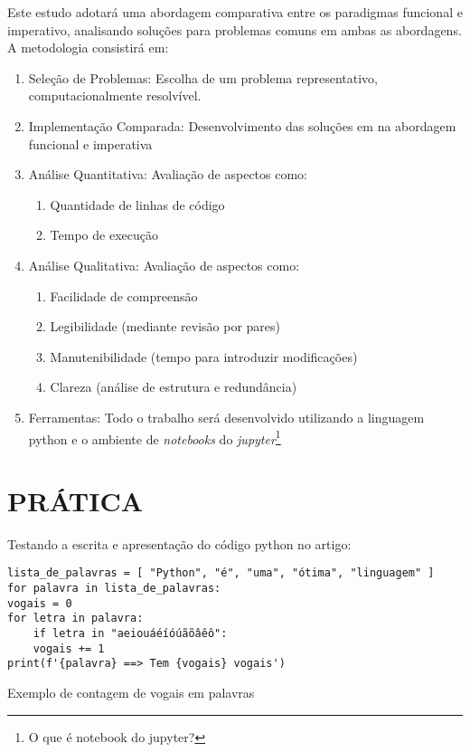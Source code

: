 \documentclass[date,twocolumn,a4paper]{ppgem}
\begin{document}
Este estudo adotará uma abordagem comparativa entre os paradigmas funcional e imperativo, analisando soluções para problemas comuns em ambas as abordagens. A metodologia consistirá em:
\begin{enumerate}
    \item Seleção de Problemas: Escolha de um problema representativo, computacionalmente resolvível.
    \item Implementação Comparada: Desenvolvimento das soluções em na abordagem funcional e imperativa
    \item Análise Quantitativa: Avaliação de aspectos como:
    \begin{enumerate}
        \item Quantidade de linhas de código
        \item Tempo de execução
    \end{enumerate}
    \item Análise Qualitativa: Avaliação de aspectos como:
    \begin{enumerate}
        \item Facilidade de compreensão
        \item Legibilidade (mediante revisão por pares)
        \item Manutenibilidade (tempo para introduzir modificações)
        \item Clareza (análise de estrutura e redundância)
    \end{enumerate}
    \item Ferramentas: Todo o trabalho será desenvolvido utilizando a linguagem python
        e o ambiente de \textit{notebooks} do \textit{jupyter}\footnote{O que é notebook do jupyter?}
\end{enumerate}




\section{PRÁTICA}

Testando a escrita e apresentação do código python no artigo:

\renewcommand{\listingscaption}{Código}

\begin{listing}[!ht]
\begin{verbatim}
lista_de_palavras = [ "Python", "é", "uma", "ótima", "linguagem" ]
for palavra in lista_de_palavras:
vogais = 0
for letra in palavra:
    if letra in "aeiouáéíóúãõâêô":
    vogais += 1
print(f'{palavra} ==> Tem {vogais} vogais')
\end{verbatim}
\caption{Exemplo de contagem de vogais em palavras}
\label{listing:2}
\end{listing}
\end{document}

